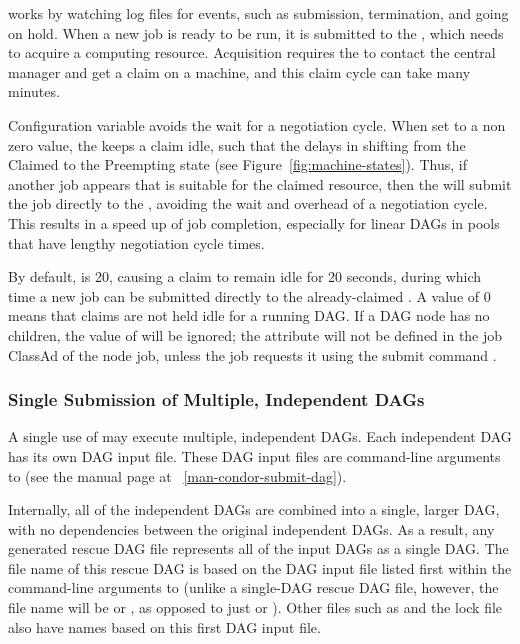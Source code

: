  works by watching log files for events, such as submission,
termination, and going on hold.
When a new job is ready to be run, it is submitted to the , 
which needs to acquire a computing resource. 
Acquisition requires the  to contact the central
manager and get a claim on a machine,
and this claim cycle can take many minutes.

Configuration variable
avoids the wait for a negotiation cycle.
When set to a non zero value, 
the  keeps a claim idle,
such that the  delays in shifting from
the Claimed to the Preempting state (see Figure~\ref{fig:machine-states}).
Thus, if another job appears that is suitable for the claimed resource,
then the  will submit the job directly to the , 
avoiding the wait and overhead of a negotiation cycle.
This results in a speed up of job completion,
especially for linear DAGs in pools that have lengthy negotiation cycle times.

By default,  is 20, 
causing a claim to remain idle for 20 seconds, 
during which time a new job can be submitted
directly to the already-claimed . 
A value of 0 means that claims are not held idle for a running DAG.
If a DAG node has no children,
the value of  will be ignored;
the  attribute will not be defined in the job ClassAd 
of the node job, unless the job requests it using the submit command
. 

\subsubsection{\label{sec:MultipleDAGs}Single Submission of Multiple, Independent DAGs}

A single use of  may execute multiple, independent DAGs.
Each independent DAG has its own DAG input file.
These DAG input files are command-line arguments to
(see the  manual page at ~\ref{man-condor-submit-dag}).

Internally, all of the independent DAGs are combined
into a single, larger DAG, with no dependencies between
the original independent DAGs.
As a result,
any generated rescue DAG file represents all of the input DAGs
as a single DAG.
The file name of this rescue DAG is based on the DAG input file
listed first within the command-line arguments to
 (unlike a single-DAG rescue DAG file, however,
the file name will be
 or
,
as opposed to
just 
or ).
Other files such
as  and the lock file also have names based on this
first DAG input file.

